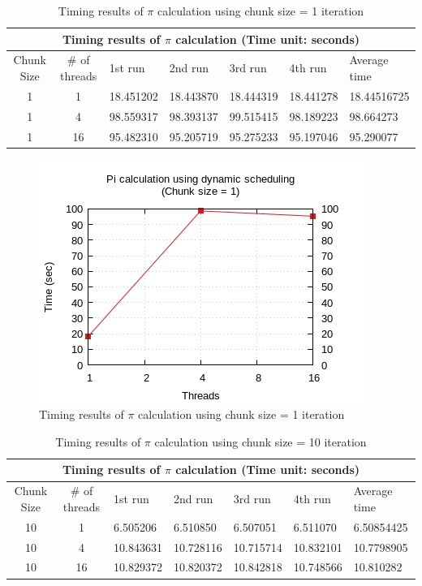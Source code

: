 \documentclass{article}
\begin{document}
\begin{table}[htbp]
  \centering
    \begin{tabular}{|c c||l l l l| l|} 
    \hline
    \multicolumn{7}{|c|}{Timing results of $\pi$ calculation (Time unit: seconds)} \\
    \hline
    Chunk Size & \# of threads & 1st run & 2nd run & 3rd run & 4th run & Average time\\ [0.5ex] 
    \hline\hline
    1 & 1 & 18.451202 & 18.443870 & 18.444319 & 18.441278 & 18.44516725 \\ 
    \hline
    1 & 4 & 98.559317 & 98.393137 & 99.515415 & 98.189223 & 98.664273 \\
    \hline
    1 & 16 & 95.482310 & 95.205719 & 95.275233 & 95.197046 & 95.290077 \\ [1ex]
    \hline
    \end{tabular}
  \caption{Timing results of $\pi$ calculation using chunk size = 1 iteration}
\end{table}


\begin{figure}[htbp]
  \centering
  \includegraphics[width=0.55\columnwidth]{../ex1/plots/pi_c1.png}
  \caption{Timing results of $\pi$ calculation using chunk size = 1 iteration}
\end{figure}


\begin{table}[htbp]
  \centering
    \begin{tabular}{|c c||l l l l| l|} 
    \hline
    \multicolumn{7}{|c|}{Timing results of $\pi$ calculation (Time unit: seconds)} \\
    \hline
    Chunk Size & \# of threads & 1st run & 2nd run & 3rd run & 4th run & Average time\\ [0.5ex] 
    \hline\hline
    10 & 1 & 6.505206 & 6.510850 & 6.507051 & 6.511070 & 6.50854425 \\
    \hline
    10 & 4 & 10.843631 & 10.728116 & 10.715714 & 10.832101 & 10.7798905 \\
    \hline
    10 & 16 & 10.829372 & 10.820372 & 10.842818 & 10.748566 & 10.810282 \\ [1ex]
    \hline
    \end{tabular}
  \caption{Timing results of $\pi$ calculation using chunk size = 10 iteration}
\end{table}
\end{document}
